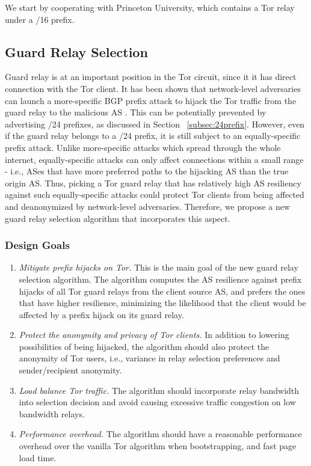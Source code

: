 We start by cooperating with Princeton University, which contains a Tor relay under a /16 prefix. 

\subsection{Guard Relay Selection}
\label{subsec:relayselection}

Guard relay is at an important position in the Tor circuit, since it  it has direct connection with the Tor client. It has been shown that network-level adversaries can launch a more-specific BGP prefix attack to hijack the Tor traffic from the guard relay to the malicious AS \cite{sun2015raptor}. This can be potentially prevented by advertising /24 prefixes, as discussed in Section ~\ref{subsec:24prefix}. However, even if the guard relay belongs to a /24 prefix, it is still subject to an equally-specific prefix attack. Unlike more-specific attacks which spread through the whole internet, equally-specific attacks can only affect connections within a small range - i.e., ASes that have more preferred paths to the hijacking AS than the true origin AS. Thus, picking a Tor guard relay that has relatively high AS resiliency against such equally-specific attacks could protect Tor clients from being affected and deanonymized by network-level adversaries. Therefore, we propose a new guard relay selection algorithm that incorporates this aspect.

\subsubsection{Design Goals}
\begin{enumerate}
\item \emph{Mitigate prefix hijacks on Tor.} This is the main goal of the new guard relay selection algorithm. The algorithm computes the AS resilience against prefix hijacks of all Tor guard relays from the client source AS, and prefers the ones that have higher resilience, minimizing the likelihood that the client would be affected by a prefix hijack on its guard relay. 
\item \emph{Protect the anonymity and privacy of Tor clients.} In addition to lowering possibilities of being hijacked, the algorithm should also protect the anonymity of Tor users, i.e., variance in relay selection preferences and sender/recipient anonymity. 
\item \emph{Load balance Tor traffic.} The algorithm should incorporate relay bandwidth into selection decision and avoid causing excessive traffic congestion on low bandwidth relays. 
\item \emph{Performance overhead.} The algorithm should have a reasonable performance overhead over the vanilla Tor algorithm when bootstrapping, and fast page load time. 
\end{enumerate}

